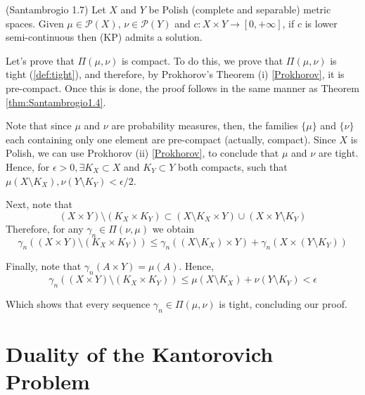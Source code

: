 \begin{theorem}(Santambrogio 1.7)
  Let $X$ and $Y$ be Polish (complete and separable) metric spaces.
  Given $\mu\in \mathcal{P}(X)$, $\nu \in \mathcal P(Y)$ and
  $c:X\times Y \to[0,+\infty]$, if $c$ is lower semi-continuous then
  (KP) admits a solution.
  \label{thm:existanceKPpolish}
\end{theorem}
\begin{prf}

  Let's prove that $\Pi(\mu,\nu)$ is compact. To do this,
  we prove that $\Pi(\mu,\nu)$
  is tight (\ref{def:tight}), and therefore, by Prokhorov's Theorem (i) \ref{Prokhorov},
  it is pre-compact. Once this is done,
  the proof follows in the same manner as Theorem
  \ref{thm:Santambrogio1.4}.

  Note that since $\mu$ and $\nu$ are probability measures, then,
  the families $\{\mu\}$ and $\{\nu\}$ each containing only one element
  are pre-compact (actually, compact). Since $X$ is Polish, we can use Prokhorov (ii)
  \ref{Prokhorov}, to conclude that $\mu$ and $\nu$ are tight.
  Hence,
  for $\epsilon > 0, \exists K_X \subset X$ and $K_Y \subset Y$
  both compacts, such that
  $\mu(X\setminus K_X), \nu(Y\setminus K_Y)<\epsilon /2$.

  Next, note that
  \begin{equation*}
    (X \times Y) \setminus (K_X \times K_Y) \subset
    (X \setminus K_X \times Y)\cup
    (X \times Y \setminus K_Y)
  \end{equation*}
  Therefore, for any $\gamma_n \in \Pi(\nu,\mu)$ we obtain
  \begin{equation*}
    \gamma_n((X \times Y) \setminus (K_X \times K_Y)) \leq
    \gamma_n((X \setminus K_X) \times Y) +
    \gamma_n(X \times (Y \setminus K_Y))
  \end{equation*}

  Finally, note that $\gamma_n(A \times Y) = \mu(A)$. Hence,
  \begin{equation*}
    \gamma_n((X \times Y) \setminus (K_X \times K_Y)) \leq
    \mu(X \setminus K_X) +
    \nu(Y \setminus K_Y) < \epsilon
  \end{equation*}

  Which shows that every sequence $\gamma_n \in \Pi(\mu,\nu)$ is
  tight, concluding our proof.


\end{prf}

\newpage
\chapter{Duality of the Kantorovich Problem}

